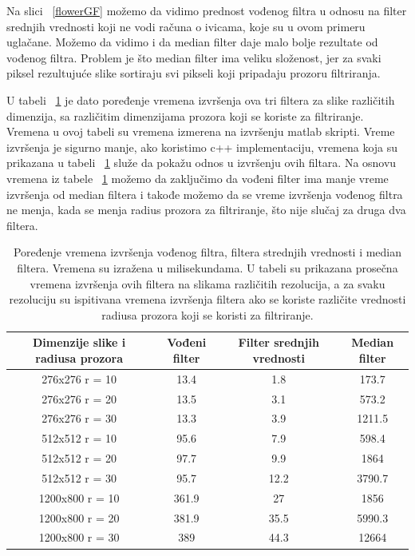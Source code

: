 \documentclass[a4paper,12pt,titlepage]{article}
\begin{document}
Na slici ~\ref{flowerGF} možemo da vidimo prednost vođenog filtra u odnosu na filter srednjih vrednosti koji ne vodi računa o ivicama, koje su u ovom primeru uglačane. Možemo da vidimo i da median filter daje malo bolje rezultate od vođenog filtra. Problem je što median filter ima veliku složenost, jer za svaki piksel rezultujuće slike sortiraju svi pikseli koji pripadaju prozoru filtriranja.

U tabeli ~\ref{tabela} je dato poređenje vremena izvršenja ova tri filtera za slike različitih dimenzija, sa različitim dimenzijama prozora koji se koriste za filtriranje. Vremena u ovoj tabeli su vremena izmerena na izvršenju matlab skripti. Vreme izvršenja je sigurno manje, ako koristimo c++ implementaciju, vremena koja su prikazana u tabeli ~\ref{tabela} služe da pokažu odnos u izvršenju ovih filtara. Na osnovu vremena iz tabele ~\ref{tabela} možemo da zaključimo da vođeni filter ima manje vreme izvršenja od median filtera i takođe možemo da se vreme izvršenja vođenog filtra ne menja, kada se menja radius prozora za filtriranje, što nije slučaj za druga dva filtera. 

\begin{table}[h!]
\centering
\begin{tabular}{| c | c c c|} 
 \hline
 Dimenzije slike i radiusa prozora & Vođeni filter & Filter srednjih vrednosti & Median filter \\ [0.5ex] 
 \hline
  276x276 r = 10 & 13.4 & 1.8 & 173.7  \\ 
  276x276 r = 20 & 13.5 & 3.1 & 573.2  \\
  276x276 r = 30 & 13.3 & 3.9 & 1211.5 \\
  512x512 r = 10 & 95.6 & 7.9 & 598.4 \\
  512x512 r = 20 & 97.7 & 9.9 & 1864  \\
  512x512 r = 30 & 95.7 & 12.2 & 3790.7 \\
  1200x800 r = 10 & 361.9 & 27 & 1856 \\
  1200x800 r = 20 & 381.9 & 35.5 & 5990.3 \\
  1200x800 r = 30 & 389 & 44.3 & 12664 \\ [1ex] 
 \hline
\end{tabular}
\caption{Poređenje vremena izvršenja vođenog filtra, filtera strednjih vrednosti i median filtera. Vremena su izražena u milisekundama. U tabeli su prikazana prosečna vremena izvršenja ovih filtera na slikama različitih rezolucija, a za svaku rezoluciju su ispitivana vremena izvršenja  filtera ako se koriste različite vrednosti radiusa prozora koji se koristi za filtriranje. }
\label{tabela}
\end{table}
\end{document}
